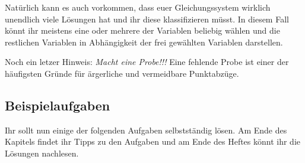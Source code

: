 Natürlich kann es auch vorkommen, dass euer Gleichungssystem wirklich unendlich viele Lösungen hat und ihr diese klassifizieren müsst. In diesem Fall könnt ihr meistens eine oder mehrere der Variablen beliebig wählen und die restlichen Variablen in Abhängigkeit der frei gewählten Variablen darstellen.

Noch ein letzer Hinweis: \emph{Macht eine Probe!!!} Eine fehlende Probe ist einer der häufigsten Gründe für ärgerliche und vermeidbare Punktabzüge.

\subsection*{Beispielaufgaben}

Ihr sollt nun einige der folgenden Aufgaben selbstständig lösen. Am Ende des Kapitels findet ihr Tipps zu den Aufgaben und am Ende des Heftes könnt ihr die Lösungen nachlesen.

